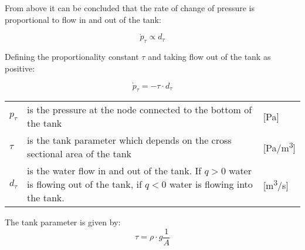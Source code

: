 From above it can be concluded that the rate of change of pressure is proportional to flow in and out of the tank:

\begin{equation} \label{eq:dotp prop dt}
	\dot{p}_{\tau} \propto d_\tau 
\end{equation}

Defining the proportionality constant $\tau$ and taking flow out of the tank as positive:

\begin{equation} \label{eq:dpTank}
	\dot{p}_{\tau}=-\tau \cdot d_{\tau} 
\end{equation} 

\begin{center}
	\begin{tabular}{l p{10cm} l}
		$p_\tau$ & is the pressure at the node connected to the bottom of the tank & [\si{Pa}]\\
		$\tau$ & is the tank parameter which depends on the cross sectional area of the tank & [\si{Pa}/\si{m\cubed}]\\
		$d_\tau$ & is the water flow in and out of the tank. If $q > 0$ water is flowing out of the tank, if $q < 0$ water is flowing into the tank. & [\si{m\cubed}/\si{s}] 
		\end{tabular}
\end{center}

The tank parameter is given by:
\begin{equation}\label{eq:TankParameter}
\tau = \rho \cdot g \frac{1}{A}
\end{equation}
 
